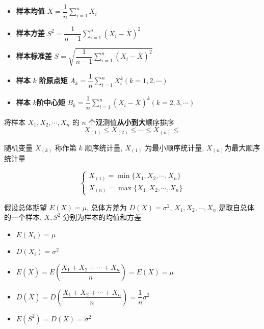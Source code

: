 \begin{definition}[样本数字特征]
	\begin{itemize}
		\item \textbf{样本均值} $\overline{X} = \dfrac{1}{n}\sum\limits_{i = 1}^{n}X_{i}$
		\item \textbf{样本方差} $S^{2} =\dfrac{1}{n-1}\sum\limits_{i = 1}^{n}(X_{i}-\overline{X})^2$
		\item \textbf{样本标准差} $S = \sqrt{\dfrac{1}{n-1}\sum\limits_{i = 1}^{n}(X_{i} - \overline{X})^{2}}$
		\item \textbf{样本} $k$ \textbf{阶原点矩}  $A_{k} = \dfrac{1}{n}\sum\limits_{i = 1}^{n}X_{i}^{k} (k = 1,2,\cdots)$
		\item \textbf{样本} $k$\textbf{阶中心矩} $B_{k} = \dfrac{1}{n}\sum\limits_{i = 1}^{n}(X_{i}-\overline{X})^{k} (k = 2, 3, \cdots)$
	\end{itemize}
\end{definition}

\begin{definition}[顺序统计量]
	将样本 $X_{1}, X_{2}, \cdots, X_{n}$ 的 $n$ 个观测值\textbf{从小到大}顺序排序 
	$$X_{(1)} \leq X_{(2)} \leq \cdots \leq X_{(n)}\leq$$
	
	随机变量 $X_{(k)}$ 称作第 $k$ 顺序统计量, $X_{(1)}$ 为最小顺序统计量, $X_{(n)}$为最大顺序统计量

	$$\begin{cases}
		X_{(1)} = \min\{X_{1},X_{2},\cdots,X_{n}\}\\
		X_{(n)} = \max\{X_{1},X_{2},\cdots,X_{n}\}
	\end{cases}$$
\end{definition}
\begin{corollary}
	假设总体期望 $E(X)=\mu$, 总体方差为 $D(X) = \sigma^{2}$, $X_{1},X_{2},\cdots,X_{n}$ 是取自总体的一个样本, $\overline{X},S^{2}$ 分别为样本的均值和方差 
	\begin{itemize}
		\item $E(X_{i}) = \mu$
		\item $D(X_{i}) = \sigma^{2}$
		\item $E(\overline{X}) = E(\dfrac{X_{1}+X_{2}+\cdots+X_{n}}{n}) = E(X) = \mu$
		\item $D(\overline{X}) = D(\dfrac{X_{1}+X_{2}+\cdots+X_{n}}{n}) = \dfrac{1}{n}\sigma^{2}$
		\item $E(S^{2}) = D(X) = \sigma^{2}$
	\end{itemize}
\end{corollary}
